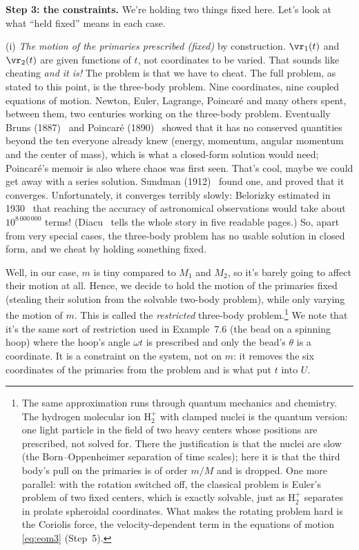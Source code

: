 \documentclass[12pt]{article}
\numberwithin{equation}{section}
\newcommand{\tocentry}[2][subsection]{\phantomsection\addcontentsline{toc}{#1}{#2}}
\begin{document}
\medskip

\tocentry[subsection]{Step 3: the constraints}
\noindent\textbf{Step 3: the constraints.} We're holding two things fixed here.
Let's look at what ``held fixed'' means in each case.

\smallskip
\noindent (i) \emph{The motion of the primaries prescribed (fixed)} by
construction.  $\vr_1(t)$ and $\vr_2(t)$ are given
functions of $t$, not coordinates to be varied. That sounds like cheating
\emph{and it is!} The problem is that we have to cheat. The full problem, as
stated to this point, is the three-body problem. Nine coordinates, nine coupled
equations of motion. Newton, Euler, Lagrange, Poincar\'e and many others spent, between
them, two centuries working on the three-body problem. Eventually Bruns (1887)~\cite{bruns} and
Poincar\'e (1890)~\cite{poincare} showed that it has no conserved quantities beyond the ten everyone already
knew (energy, momentum, angular momentum and the center of mass), which is what a closed-form
solution would need; Poincar\'e's memoir is also where chaos was first seen. That's cool,
maybe we could get away with a series solution. Sundman (1912)~\cite{sundman} found one, and proved that it
converges. Unfortunately, it converges terribly slowly: Belorizky estimated in 1930~\cite{belorizky} that
reaching the accuracy of astronomical observations would take about $10^{8\,000\,000}$ terms!
(Diacu~\cite{diacu} tells the whole story in five readable pages.)
So, apart from very special cases, the three-body problem has no usable solution in closed
form, and we cheat by holding something fixed.

Well, in our case, $m$ is tiny compared to $M_1$ and $M_2$, so it's barely going
to affect their motion at all. Hence, we decide to hold the motion of the
primaries fixed (stealing their solution from the solvable two-body problem),
while only varying the motion of $m$. This is called the \emph{restricted}
three-body problem.\footnote{The same approximation runs through quantum
  mechanics and chemistry. The hydrogen molecular ion $\mathrm{H}_2^+$ with
  clamped nuclei is the quantum version: one light particle in the field of two
  heavy centers whose positions are prescribed, not solved for. There the
  justification is that the nuclei are slow (the Born--Oppenheimer separation of
  time scales); here it is that the third body's pull on the primaries is of
  order $m/M$ and is dropped.  One
  more parallel: with the rotation switched off, the classical problem is
  Euler's problem of two fixed centers, which is exactly solvable, just as
  $\mathrm{H}_2^+$ separates in prolate spheroidal coordinates. What makes the
  rotating problem hard is the Coriolis force, the velocity-dependent term in
  the equations of motion \eqref{eq:eom3} (Step~5).} We note that it's the same
sort of restriction used in Example~7.6 (the bead on a spinning hoop) where the
hoop's angle $\omega t$ is prescribed and only the bead's $\theta$ is a coordinate. It is
a constraint on the system, not on $m$: it removes the six coordinates of the
primaries from the problem and is what put $t$ into $U$.
\end{document}
